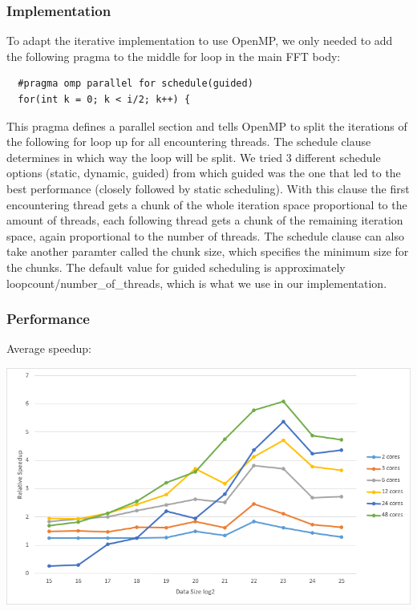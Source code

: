 \subsubsection{Implementation}

To adapt the iterative implementation to use OpenMP, we only needed to add the following pragma to the middle for loop in the main FFT body:

\begin{lstlisting}
  #pragma omp parallel for schedule(guided)
  for(int k = 0; k < i/2; k++) {
\end{lstlisting}

This pragma defines a parallel section and tells OpenMP to split the iterations of the following for loop up for all encountering threads. The schedule clause determines in which way the loop will be split.
We tried 3 different schedule options (static, dynamic, guided) from which guided was the one that led to the best performance (closely followed by static scheduling). With this clause the first encountering thread
gets a chunk of the whole iteration space proportional to the amount of threads, each following thread gets a chunk of the remaining iteration space, again proportional to the number of threads. The schedule clause can also take
another paramter called the chunk size, which specifies the minimum size for the chunks. The default value for guided scheduling is approximately loopcount/number\_of\_threads, which is what we use in our implementation.

\subsubsection{Performance}

Average speedup:

\includegraphics[width=\textwidth]{omp_it_avg.png}

